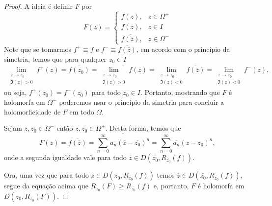     \begin{proof}
        A ideia é definir $F$ por
        \begin{equation*}
            F(z) =
            \begin{cases}
                f(z), & z \in \Omega^+ \\
                f(z), & z \in I \\
                \overline{f(\overline{z})}, & z\in\Omega^-   
            \end{cases}
        \end{equation*}
        Note que se tomarmos $f^+ \equiv f$ e $f^- \equiv \overline{f(\overline{z})}$, 
        em acordo com o princípio da simetria, temos que para qualquer $z_0\in I$
        \begin{align*}
            \lim_{\substack{ z\to z_0 \\ \Im(z) > 0 }} f^+(z) 
            = 
            \overline{f(z_0)}
            =
            \overline{\lim_{\substack{ z\to z_0 \\ \Im(z) > 0 }} f(z)}
            =
            \lim_{\substack{ z\to z_0 \\ \Im(z) < 0 }} \overline{f(\overline{z})}
            =
            \lim_{\substack{ z\to z_0 \\ \Im(z) < 0 }} f^-(z),
        \end{align*}
        ou seja, $f^+(z_0) = f^-(z_0)$ para todo $z_0\in I$. Portanto, mostrando que 
        $F$ é holomorfa em $\Omega^-$ poderemos usar o princípio da simetria para 
        concluir a holomorficidade de $F$ em todo $\Omega$.
        
        Sejam $z, z_0\in\Omega^-$ então $\overline{z}, \overline{z_0}\in\Omega^+$. 
        Desta forma, temos que
        \begin{equation*}
            F(z) 
            = 
            \overline{f(\overline{z})} 
            =
            \overline{ \sum_{n=0}^{\infty}a_n(\overline{z} - \overline{z_0})^n }
            =
            \sum_{n=0}^{\infty}\overline{a_n}(z-z_0)^n,
        \end{equation*}
        onde a segunda igualdade vale para todo 
        $\overline{z}\in D(\overline{z_0}, R_{\overline{z_0}}(f))$.
        
        Ora, uma vez que para todo $z\in D(z_0, R_{\overline{z_0}}(f))$ temos
        $\overline{z}\in D(\overline{z_0}, R_{\overline{z_0}}(f))$, segue da equação acima
        que $R_{z_0}(F)\geq R_{\overline{z_0}}(f)$ e, portanto, $F$ é holomorfa em
        $D(z_0, R_{z_0}(F))$.
    \end{proof}
%

